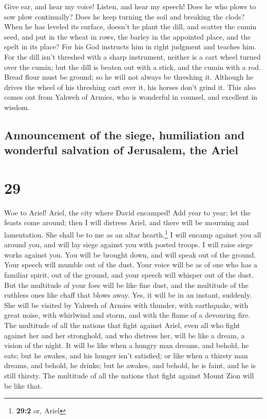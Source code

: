  Give ear, and hear my voice! Listen, and hear my speech!
 Does he who plows to sow plow continually? Does he keep
turning the soil and breaking the clods?  When he has
leveled its surface, doesn't he plant the dill, and scatter the cumin
seed, and put in the wheat in rows, the barley in the appointed place,
and the spelt in its place?  For his God instructs him in
right judgment and teaches him.  For the dill isn't
threshed with a sharp instrument, neither is a cart wheel turned over
the cumin; but the dill is beaten out with a stick, and the cumin with a
rod.  Bread flour must be ground; so he will not always
be threshing it. Although he drives the wheel of his threshing cart over
it, his horses don't grind it.  This also comes out from
Yahweh of Armies, who is wonderful in counsel, and excellent in wisdom.

\hypertarget{announcement-of-the-siege-humiliation-and-wonderful-salvation-of-jerusalem-the-ariel}{%
\subsection{Announcement of the siege, humiliation and wonderful
salvation of Jerusalem, the
Ariel}\label{announcement-of-the-siege-humiliation-and-wonderful-salvation-of-jerusalem-the-ariel}}

\hypertarget{section-28}{%
\section{29}\label{section-28}}

 Woe to Ariel! Ariel, the city where David encamped! Add
year to year; let the feasts come around;  then I will
distress Ariel, and there will be mourning and lamentation. She shall be
to me as an altar hearth.\footnote{\textbf{29:2} or, Ariel}
 I will encamp against you all around you, and will lay
siege against you with posted troops. I will raise siege works against
you.  You will be brought down, and will speak out of the
ground. Your speech will mumble out of the dust. Your voice will be as
of one who has a familiar spirit, out of the ground, and your speech
will whisper out of the dust.  But the multitude of your
foes will be like fine dust, and the multitude of the ruthless ones like
chaff that blows away. Yes, it will be in an instant, suddenly.
 She will be visited by Yahweh of Armies with thunder,
with earthquake, with great noise, with whirlwind and storm, and with
the flame of a devouring fire.  The multitude of all the
nations that fight against Ariel, even all who fight against her and her
stronghold, and who distress her, will be like a dream, a vision of the
night.  It will be like when a hungry man dreams, and
behold, he eats; but he awakes, and his hunger isn't satisfied; or like
when a thirsty man dreams, and behold, he drinks; but he awakes, and
behold, he is faint, and he is still thirsty. The multitude of all the
nations that fight against Mount Zion will be like that.

